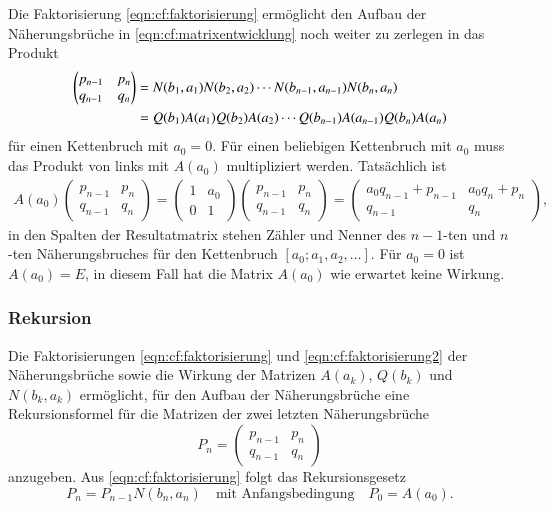 Die Faktorisierung \eqref{eqn:cf:faktorisierung} ermöglicht den Aufbau
der Näherungsbrüche in \eqref{eqn:cf:matrixentwicklung} noch weiter
zu zerlegen in das Produkt
\begin{align}
\begin{pmatrix}
p_{n-1}&p_n\\
q_{n-1}&q_n
\end{pmatrix}
&=
N(b_1,a_1)
N(b_2,a_2)
\cdots
N(b_{n-1},a_{n-1})
N(b_n,a_n)
\notag
\\
&=
Q(b_1)
A(a_1)
Q(b_2)
A(a_2)
\cdots
Q(b_{n-1})
A(a_{n-1})
Q(b_{n})
A(a_{n})
\label{eqn:cf:faktorisierung2}
\end{align}
für einen Kettenbruch mit $a_0=0$. 
Für einen beliebigen Kettenbruch mit $a_0$ muss das Produkt von links
mit $A(a_0)$ multipliziert werden.
Tatsächlich ist
\begin{align*}
A(a_0)
\begin{pmatrix}
p_{n-1}&p_n\\
q_{n-1}&q_n
\end{pmatrix}
=
\begin{pmatrix}
1&a_0\\
0&1
\end{pmatrix}
\begin{pmatrix}
p_{n-1}&p_n\\
q_{n-1}&q_n
\end{pmatrix}
=
\begin{pmatrix}
a_0q_{n-1}+p_{n-1}&a_0q_{n}+p_{n}\\
           q_{n-1}&         q_{n}
\end{pmatrix},
\end{align*}
in den Spalten der Resultatmatrix stehen Zähler und Nenner des
$n-1$-ten und $n$-ten Näherungsbruches für den Kettenbruch
$[a_0;a_1,a_2,\dots]$.
Für $a_0=0$ ist $A(a_0)=E$, in diesem Fall hat die Matrix $A(a_0)$
wie erwartet keine Wirkung.

\subsubsection{Rekursion}
Die Faktorisierungen \eqref{eqn:cf:faktorisierung} und
\eqref{eqn:cf:faktorisierung2} der Näherungsbrüche sowie die 
Wirkung der Matrizen $A(a_k)$, $Q(b_k)$ und $N(b_k,a_k)$ ermöglicht,
für den Aufbau der Näherungsbrüche eine Rekursionsformel für die 
Matrizen der zwei letzten Näherungsbrüche
\[
P_n
=
\begin{pmatrix}
p_{n-1}&p_n\\
q_{n-1}&q_n
\end{pmatrix}
\]
anzugeben.
Aus \eqref{eqn:cf:faktorisierung} folgt das Rekursionsgesetz
\begin{equation}
P_n = P_{n-1} N(b_n,a_n)
\quad
\text{mit Anfangsbedingung}
\quad
P_0 = A(a_0).
\label{eqn:cf:rekursion}
\end{equation}


